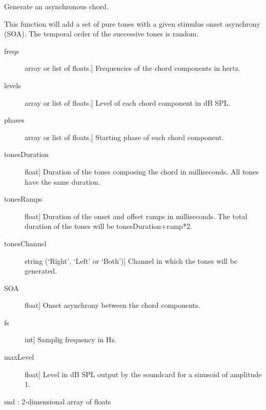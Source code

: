 \documentclass[letterpaper,10pt,english]{sphinxmanual}
\begin{document}

\begin{fulllineitems}
\label{index:sndlib.makeAsynchChord}
Generate an asynchronous chord.

This function will add a set of pure tones with a given
stimulus onset asynchrony (SOA). The temporal order of the
successive tones is random.
\begin{description}
\item[{freqs}] \leavevmode{[}array or list of floats.{]}
Frequencies of the chord components in hertz.

\item[{levels}] \leavevmode{[}array or list of floats.{]}
Level of each chord component in dB SPL.

\item[{phases}] \leavevmode{[}array or list of floats.{]}
Starting phase of each chord component.

\item[{tonesDuration}] \leavevmode{[}float{]}
Duration of the tones composing the chord in milliseconds.
All tones have the same duration.

\item[{tonesRamps}] \leavevmode{[}float{]}
Duration of the onset and offset ramps in milliseconds.
The total duration of the tones will be tonesDuration+ramp*2.

\item[{tonesChannel}] \leavevmode{[}string (`Right', `Left' or `Both'){]}
Channel in which the tones will be generated.

\item[{SOA}] \leavevmode{[}float{]}
Onset asynchrony between the chord components.

\item[{fs}] \leavevmode{[}int{]}
Samplig frequency in Hz.

\item[{maxLevel}] \leavevmode{[}float{]}
Level in dB SPL output by the soundcard for a sinusoid of amplitude 1.

\end{description}

snd : 2-dimensional array of floats


\end{fulllineitems}
\end{document}

